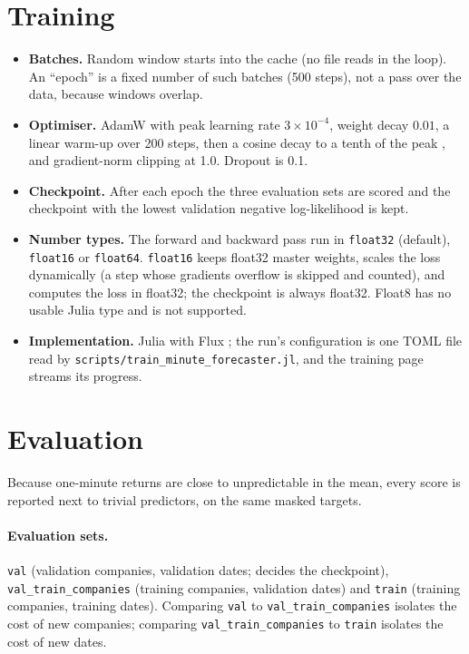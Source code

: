 \documentclass[11pt]{article}
\newcommand{\code}[1]{\texttt{#1}}
\begin{document}
\section{Training}

\begin{itemize}
  \item \textbf{Batches.} Random window starts into the cache (no file reads in the loop). An ``epoch'' is a fixed number of such batches (500 steps), not a pass over the data, because windows overlap.
  \item \textbf{Optimiser.} AdamW \citep{loshchilov2019adamw} with peak learning rate $3\times10^{-4}$, weight decay $0.01$, a linear warm-up over 200 steps, then a cosine decay to a tenth of the peak
        \citep{loshchilov2017sgdr}, and gradient-norm clipping at 1.0. Dropout is 0.1.
  \item \textbf{Checkpoint.} After each epoch the three evaluation sets are scored and the checkpoint with the lowest validation negative log-likelihood is kept.
  \item \textbf{Number types.} The forward and backward pass run in \code{float32} (default), \code{float16} or \code{float64}. \code{float16} keeps float32 master weights, scales the loss dynamically
        \citep{micikevicius2018mixed} (a step whose gradients overflow is skipped and counted), and computes the loss in float32; the checkpoint is always float32. Float8 has no usable Julia type and is not supported.
  \item \textbf{Implementation.} Julia with Flux \citep{innes2018flux}; the run's configuration is one TOML file read by \code{scripts/train\_minute\_forecaster.jl}, and the training page streams its progress.
\end{itemize}

\section{Evaluation}\label{sec:eval}

Because one-minute returns are close to unpredictable in the mean, every score is reported next to trivial predictors, on the same masked targets.

\paragraph{Evaluation sets.} \code{val} (validation companies, validation dates; decides the checkpoint), \code{val\_train\_\allowbreak companies} (training companies, validation dates) and \code{train} (training companies, training dates).
Comparing \code{val} to \code{val\_train\_\allowbreak companies} isolates the cost of new companies; comparing \code{val\_train\_\allowbreak companies} to \code{train} isolates the cost of new dates.
\end{document}
